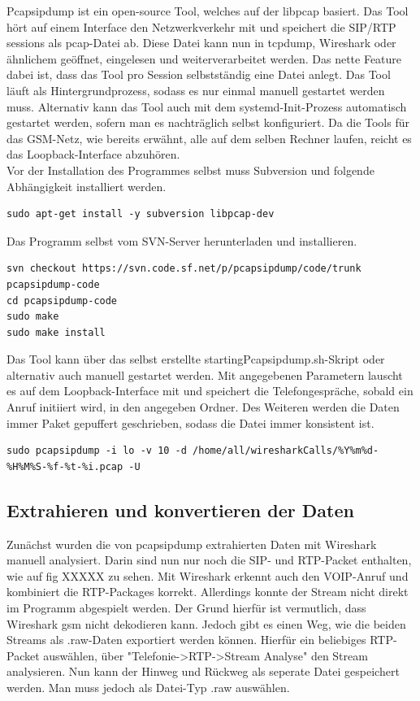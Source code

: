 Pcapsipdump ist ein open-source Tool, welches auf der libpcap basiert. Das Tool hört auf einem Interface den Netzwerkverkehr mit und speichert die SIP/RTP sessions als pcap-Datei ab. Diese Datei kann nun in tcpdump, Wireshark oder ähnlichem geöffnet, eingelesen und weiterverarbeitet werden. Das nette Feature dabei ist, dass das Tool pro Session selbstständig eine Datei anlegt. Das Tool läuft als Hintergrundprozess, sodass es nur einmal manuell gestartet werden muss. Alternativ kann das Tool auch mit dem systemd-Init-Prozess automatisch gestartet werden, sofern man es nachträglich selbst konfiguriert. Da die Tools für das GSM-Netz, wie bereits erwähnt, alle auf dem selben Rechner laufen, reicht es das Loopback-Interface abzuhören.\\

Vor der Installation des Programmes selbst muss Subversion und folgende Abhängigkeit installiert werden.
\begin{lstlisting}
sudo apt-get install -y subversion libpcap-dev
\end{lstlisting}

Das Programm selbst vom SVN-Server herunterladen und installieren.
\begin{lstlisting}
svn checkout https://svn.code.sf.net/p/pcapsipdump/code/trunk pcapsipdump-code
cd pcapsipdump-code
sudo make
sudo make install
\end{lstlisting}

Das Tool kann über das selbst erstellte startingPcapsipdump.sh-Skript oder alternativ auch manuell gestartet werden. Mit angegebenen Parametern lauscht es auf dem Loopback-Interface mit und speichert die Telefongespräche, sobald ein Anruf initiiert wird, in den angegeben Ordner. Des Weiteren werden die Daten immer Paket gepuffert geschrieben, sodass die Datei immer konsistent ist.
\begin{lstlisting}
sudo pcapsipdump -i lo -v 10 -d /home/all/wiresharkCalls/%Y%m%d-%H%M%S-%f-%t-%i.pcap -U
\end{lstlisting}

\subsection{Extrahieren und konvertieren der Daten}\label{extractData}
Zunächst wurden die von pcapsipdump extrahierten Daten mit Wireshark manuell analysiert. Darin sind nun nur noch die SIP- und RTP-Packet enthalten, wie auf fig XXXXX zu sehen. Mit Wireshark erkennt auch den VOIP-Anruf und kombiniert die RTP-Packages korrekt. Allerdings konnte der Stream nicht direkt im Programm abgespielt werden. Der Grund hierfür ist vermutlich, dass Wireshark gsm nicht dekodieren kann.
Jedoch gibt es einen Weg, wie die beiden Streams als .raw-Daten exportiert werden können. Hierfür ein beliebiges RTP-Packet auswählen, über "Telefonie->RTP->Stream Analyse" den Stream analysieren. Nun kann der Hinweg und Rückweg als seperate Datei gespeichert werden. Man muss jedoch als Datei-Typ .raw auswählen.

